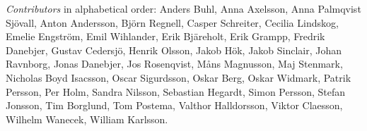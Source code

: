 \emph{Contributors} in alphabetical order:
Anders Buhl,
Anna Axelsson,
Anna Palmqvist Sjövall,
Anton Andersson,
Björn Regnell,
Casper Schreiter,
Cecilia Lindskog,
Emelie Engström,
Emil Wihlander,
Erik Bjäreholt,
Erik Grampp,
Fredrik Danebjer,
Gustav Cedersjö,
Henrik Olsson,
Jakob Hök,
Jakob Sinclair,
Johan Ravnborg,
Jonas Danebjer,
Jos Rosenqvist,
Måns Magnusson,
Maj Stenmark,
Nicholas Boyd Isacsson,
Oscar Sigurdsson,
Oskar Berg,
Oskar Widmark,
Patrik Persson,
Per Holm,
Sandra Nilsson,
Sebastian Hegardt,
Simon Persson,
Stefan Jonsson,
Tim Borglund,
Tom Postema,
Valthor Halldorsson,
Viktor Claesson,
Wilhelm Wanecek,
William Karlsson.
